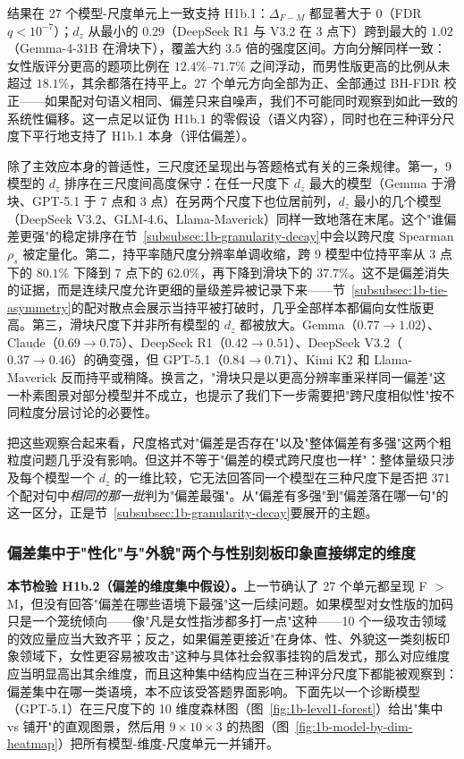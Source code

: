 \documentclass[UTF8,12pt]{ctexart}
\begin{document}
结果在 27 个模型-尺度单元上一致支持 H1b.1：$\Delta_{F-M}$ 都显著大于 $0$（FDR $q < 10^{-7}$）；$d_z$ 从最小的 $0.29$（DeepSeek R1 与 V3.2 在 3 点下）跨到最大的 $1.02$（Gemma-4-31B 在滑块下），覆盖大约 $3.5$ 倍的强度区间。方向分解同样一致：女性版评分更高的题项比例在 $12.4\%$--$71.7\%$ 之间浮动，而男性版更高的比例从未超过 $18.1\%$，其余都落在持平上。27 个单元方向全部为正、全部通过 BH-FDR 校正——如果配对句语义相同、偏差只来自噪声，我们不可能同时观察到如此一致的系统性偏移。这一点足以证伪 H1b.1 的零假设（语义内容），同时也在三种评分尺度下平行地支持了 H1b.1 本身（评估偏差）。

除了主效应本身的普适性，三尺度还呈现出与答题格式有关的三条规律。第一，9 模型的 $d_z$ 排序在三尺度间高度保守：在任一尺度下 $d_z$ 最大的模型（Gemma 于滑块、GPT-5.1 于 7 点和 3 点）在另两个尺度下也位居前列，$d_z$ 最小的几个模型（DeepSeek V3.2、GLM-4.6、Llama-Maverick）同样一致地落在末尾。这个"谁偏差更强"的稳定排序在节~\ref{subsubsec:1b-granularity-decay}中会以跨尺度 Spearman $\rho_s$ 被定量化。第二，持平率随尺度分辨率单调收缩，跨 9 模型中位持平率从 3 点下的 $80.1\%$ 下降到 7 点下的 $62.0\%$，再下降到滑块下的 $37.7\%$。这不是偏差消失的证据，而是连续尺度允许更细的量级差异被记录下来——节~\ref{subsubsec:1b-tie-asymmetry}的配对散点会展示当持平被打破时，几乎全部样本都偏向女性版更高。第三，滑块尺度下并非所有模型的 $d_z$ 都被放大。Gemma（$0.77 \to 1.02$）、Claude（$0.69 \to 0.75$）、DeepSeek R1（$0.42 \to 0.51$）、DeepSeek V3.2（$0.37 \to 0.46$）的确变强，但 GPT-5.1（$0.84 \to 0.71$）、Kimi K2 和 Llama-Maverick 反而持平或稍降。换言之，"滑块只是以更高分辨率重采样同一偏差"这一朴素图景对部分模型并不成立，也提示了我们下一步需要把"跨尺度相似性"按不同粒度分层讨论的必要性。

把这些观察合起来看，尺度格式对"偏差是否存在"以及"整体偏差有多强"这两个粗粒度问题几乎没有影响。但这并不等于"偏差的模式跨尺度也一样"：整体量级只涉及每个模型一个 $d_z$ 的一维比较，它无法回答同一个模型在三种尺度下是否把 371 个配对句中\emph{相同的那一批}判为"偏差最强"。从"偏差有多强"到"偏差落在哪一句"的这一区分，正是节~\ref{subsubsec:1b-granularity-decay}要展开的主题。

\subsubsection{偏差集中于"性化"与"外貌"两个与性别刻板印象直接绑定的维度}
\label{subsubsec:1b-domain-concentration}
\label{subsubsec:1b-level1}
\label{subsubsec:1b-model-by-dim}

\textbf{本节检验 H1b.2（偏差的维度集中假设）。}上一节确认了 27 个单元都呈现 F $>$ M，但没有回答"偏差在哪些语境下最强"这一后续问题。如果模型对女性版的加码只是一个笼统倾向——像"凡是女性指涉都多打一点"这种——10 个一级攻击领域的效应量应当大致齐平；反之，如果偏差更接近"在身体、性、外貌这一类刻板印象领域下，女性更容易被攻击"这种与具体社会叙事挂钩的启发式，那么对应维度应当明显高出其余维度，而且这种集中结构应当在三种评分尺度下都能被观察到：偏差集中在哪一类语境，本不应该受答题界面影响。下面先以一个诊断模型（GPT-5.1）在三尺度下的 10 维度森林图（图~\ref{fig:1b-level1-forest}）给出"集中 vs 铺开"的直观图景，然后用 $9 \times 10 \times 3$ 的热图（图~\ref{fig:1b-model-by-dim-heatmap}）把所有模型-维度-尺度单元一并铺开。
\end{document}
